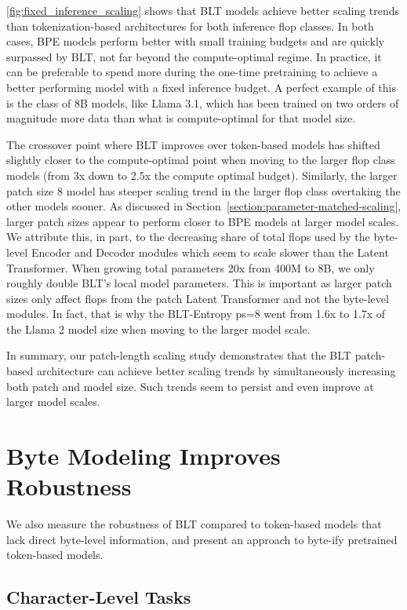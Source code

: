 \autoref{fig:fixed_inference_scaling} shows that {\textsc BLT} models achieve better scaling trends than tokenization-based architectures for both inference flop classes. In both cases, BPE models  perform better with small training budgets and are quickly surpassed by {\textsc BLT}, not far beyond the compute-optimal regime. In practice, it can be preferable to spend more during the one-time pretraining to achieve a better performing model with a fixed inference budget. A perfect example of this is the class of 8B models, like Llama 3.1, which has been trained on two orders of magnitude more data than what is compute-optimal for that model size.

The crossover point where {\textsc BLT} improves over token-based models has shifted slightly closer to the compute-optimal point when moving to the larger flop class models (from 3x down to 2.5x the compute optimal budget). Similarly, the larger patch size 8 model has steeper scaling trend in the larger flop class overtaking the other models sooner. As discussed in Section~\ref{section:parameter-matched-scaling}, larger patch sizes appear to perform closer to BPE models at larger model scales. We attribute this, in part, to the decreasing share of total flops used by the byte-level Encoder and Decoder modules which seem to scale slower than the Latent Transformer. When growing total parameters 20x from 400M to 8B, we only roughly double {\textsc BLT}'s local model parameters. This is important as larger patch sizes only affect flops from the patch Latent Transformer and not the byte-level modules. In fact, that is why the {\textsc BLT}-Entropy ps=8 went from 1.6x to 1.7x of the Llama 2 model size when moving to the larger model scale.

In summary, our patch-length scaling study demonstrates that the {\textsc BLT} patch-based architecture can achieve better scaling trends by simultaneously increasing both patch and model size. Such trends seem to persist and even improve at larger model scales.

\section{Byte Modeling Improves Robustness} We also measure the robustness of {\textsc BLT} compared to token-based models that lack direct byte-level information, and present an approach to byte-ify pretrained token-based models.
\label{sec:robustness}

\subsection{Character-Level Tasks}

